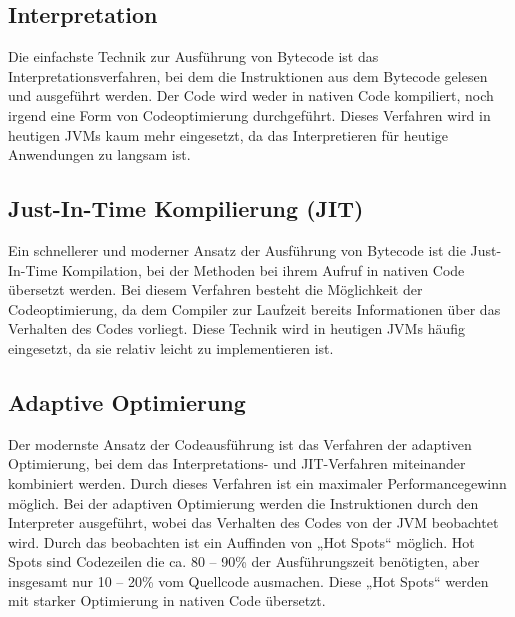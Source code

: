 \documentclass[a4paper,14pt]{scrreprt}
\begin{document}
\subsection{Interpretation}
Die einfachste Technik zur Ausführung von Bytecode ist das Interpretationsverfahren, bei dem die Instruktionen aus dem Bytecode gelesen und ausgeführt werden. Der Code wird weder in nativen Code kompiliert, noch irgend eine Form von Codeoptimierung durchgeführt. Dieses Verfahren wird in heutigen JVMs kaum mehr eingesetzt, da das Interpretieren für heutige Anwendungen zu langsam ist. 
\subsection{Just-In-Time Kompilierung (JIT)}
Ein schnellerer und moderner Ansatz der Ausführung von Bytecode ist die Just-In-Time Kompilation, bei der Methoden bei ihrem Aufruf in nativen Code übersetzt werden. Bei diesem Verfahren besteht die Möglichkeit der Codeoptimierung, da dem Compiler zur Laufzeit bereits Informationen über das Verhalten des Codes vorliegt. Diese Technik wird in heutigen JVMs häufig eingesetzt, da sie relativ leicht zu implementieren ist. 
\subsection{Adaptive Optimierung}
Der modernste Ansatz der Codeausführung ist das Verfahren der adaptiven Optimierung, bei dem das Interpretations- und JIT-Verfahren miteinander kombiniert werden. Durch dieses Verfahren ist ein maximaler Performancegewinn möglich. Bei der adaptiven Optimierung werden die Instruktionen durch den Interpreter ausgeführt, wobei das Verhalten des Codes von der JVM beobachtet wird. Durch das beobachten ist ein Auffinden von „Hot Spots“ möglich. Hot Spots sind Codezeilen die ca. 80 – 90\% der Ausführungszeit benötigten, aber insgesamt nur 10 – 20\% vom Quellcode ausmachen. Diese „Hot Spots“ werden mit starker Optimierung in nativen Code übersetzt. 
\cite{jvmExec}
\end{document}
